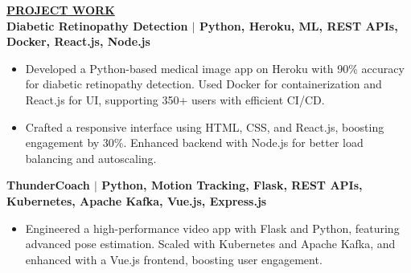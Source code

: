 \documentclass{article}
\begin{document}
\vspace{2mm} 
\noindent \textbf{\underline{PROJECT WORK}} \\
\noindent \textbf{Diabetic Retinopathy Detection $\mid$ {\small Python, Heroku, ML, REST APIs, Docker, React.js, Node.js}}
\begin{itemize}[noitemsep,nolistsep,leftmargin=*]
\item {\small Developed a Python-based medical image app on Heroku with 90\% accuracy for diabetic retinopathy detection. Used Docker for containerization and React.js for UI, supporting 350+ users with efficient CI/CD.}
\item {\small Crafted a responsive interface using HTML, CSS, and React.js, boosting engagement by 30\%. Enhanced backend with Node.js for better load balancing and autoscaling.}
\end{itemize}

\vspace{2mm} 

\noindent \textbf{ThunderCoach $\mid$ {\small Python, Motion Tracking, Flask, REST APIs, Kubernetes, Apache Kafka, Vue.js, Express.js}}
\begin{itemize}[noitemsep,nolistsep,leftmargin=*]
\item {\small Engineered a high-performance video app with Flask and Python, featuring advanced pose estimation. Scaled with Kubernetes and Apache Kafka, and enhanced with a Vue.js frontend, boosting user engagement.}
\end{itemize}



\end{document}
